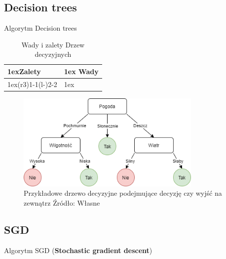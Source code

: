 \subsection{Decision trees}

Algorytm Decision trees 

\begin{table}[h]
    \begin{tabularx}{\linewidth}{>{\parskip1ex}X@{\kern4\tabcolsep}>{\parskip1ex}X}
    \toprule
    \hfil\bfseries Zalety
    &
    \hfil\bfseries Wady
    \\\cmidrule(r{3\tabcolsep}){1-1}\cmidrule(l{-\tabcolsep}){2-2}
    
    \par
    \par
    
    &
    
    \par
    \par
    
    \\\bottomrule
    \end{tabularx}
    \caption{Wady i zalety Drzew decyzyjnych}
\end{table}

\begin{figure}[h]
    \centering
    \includegraphics[width=0.8\textwidth]{./Img/BinaryTree.png}
    \caption{Przykładowe drzewo decyzyjne podejmujące decyzję czy wyjść na zewnątrz Źródło: Własne}
\end{figure}


\subsection{SGD}

Algorytm SGD (\textbf{Stochastic gradient descent})

